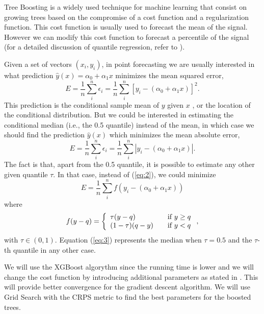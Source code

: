 \documentclass[a4paper,twocolumn,5p]{elsarticle}
\begin{document}
Tree Boosting \cite{gradientboost} is a widely used technique for machine learning 
that consist on growing trees based on the compromise 
of a cost function and a regularization function. This cost function is usually used to forecast 
the mean of the signal. However we can modify this cost function to forecast a 
percentile of the signal (for a detailed discussion of 
quantile regression, refer to \cite{koenker_quantile_2005}). 

Given a 
set of vectors $(x_i, y_i)$, in point forecasting we are usually 
interested in what prediction $\hat y(x) = \alpha_0 + \alpha_1 x$
minimizes the mean squared error,
\begin{equation}
  \label{eq:1}
  E = \frac{1}{n} \sum^n_i \epsilon_i =
  \frac{1}{n} \sum^n_i [ y_i - (\alpha_0 + \alpha_1 x) ]^2.
\end{equation}
This prediction is the conditional sample mean of $y$ given $x$%
, or the location of the conditional distribution. But we could be
interested in estimating the conditional median (i.e., the 0.5
quantile) instead of the mean, in which case we should find the
prediction $\hat y(x)$ which minimizes the mean absolute error,
\begin{equation}
  \label{eq:2}
  E = \frac{1}{n} \sum^n_i \epsilon_i =
  \frac{1}{n} \sum^n_i | y_i - (\alpha_0 + \alpha_1 x) |.
\end{equation}
The fact is that, apart from the 0.5 quantile, it is possible to
estimate any other given quantile $\tau$. In that case, instead of
(\ref{eq:2}), we could minimize
\begin{equation}
  \label{eq:3}
E= \frac{1}{n} \sum^n_i f( y_i - (\alpha_0 + \alpha_1 x))
\end{equation}
where
\begin{equation}
  \label{eq:4}
  f(y-q) = \left\{ 
\begin{array}{l l}
\tau (y-q) & \quad \mbox{if $y \ge q$}\\
(1-\tau) (q-y) & \quad \mbox{if $y < q$}\\
\end{array} \right.,
\end{equation}
with $\tau \in (0,1)$. Equation (\ref{eq:3}) represents the
median when $\tau=0.5$ and the $\tau$-th quantile in any other case.

We will use the XGBoost algorythm \cite{xgb} since the running time is lower and we will change the cost 
function by introducing additional parameters as stated in \cite{qxgb}. This will provide better 
convergence for the gradient descent algorithm. We will use Grid Search with the CRPS metric 
to find the best parameters for the boosted trees.
\end{document}
